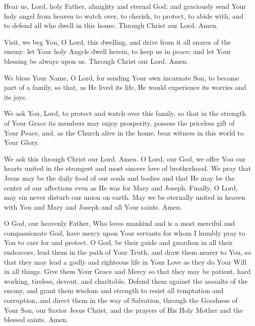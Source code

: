 Hear us, Lord, holy Father, almighty and eternal God;
and graciously send Your holy angel from heaven to watch over, to cherish, to protect, to abide with, and to defend all who dwell in this house.
Through Christ our Lord. Amen.

Visit, we beg You, O Lord, this dwelling, and drive from it all snares of the enemy:
let Your holy Angels dwell herein, to keep us in peace;
and let Your blessing be always upon us.
Through Christ our Lord.
Amen.

We bless Your Name, O Lord, for sending Your own incarnate Son, to become part of a family, so that, as He lived its life, He would experience its worries and its joys.

We ask You, Lord, to protect and watch over this family, so that in the strength of Your Grace its members may enjoy prosperity, possess the priceless gift of Your Peace, and, as the Church alive in the home, bear witness in this world to Your Glory.

We ask this through Christ our Lord.
Amen.
\newpage
{}
O Lord, our God, we offer You our hearts united in the strongest and most sincere love of brotherhood.
We pray that Jesus may be the daily food of our souls and bodies and that He may be the center of our affections even as He was for Mary and Joseph.
Finally, O Lord, may sin never disturb our union on earth.
May we be eternally united in heaven with You and Mary and Joseph and all Your saints.
Amen.

O God, our heavenly Father, Who loves mankind and is a most merciful and compassionate God, have mercy upon Your servants \insertname for whom I humbly pray to You to care for and protect.
O God, be their guide and guardian in all their endeavors, lead them in the path of Your Truth, and draw them nearer to You, so that they may lead a godly and righteous life in Your Love as they do Your Will in all things.
Give them Your Grace and Mercy so that they may be patient, hard working, tireless, devout, and charitable.
Defend them against the assaults of the enemy, and grant them wisdom and strength to resist all temptation and corruption, and direct them in the way of Salvation, through the Goodness of Your Son, our Savior Jesus Christ, and the prayers of His Holy Mother and the blessed saints.
Amen.

